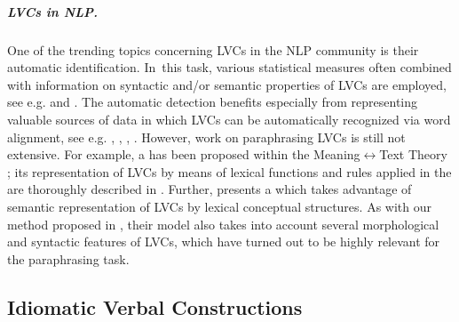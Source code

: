 \documentclass[output=paper
,modfonts
,nonflat]{langsci/langscibook}
\def\footurl#1{\footnote{\url{#1}}}
\begin{document}
\subparagraph{LVCs in NLP.} 
One of the trending topics concerning LVCs in the NLP community is their automatic identification. In~this task, various statistical measures often 
combined with information on syntactic and/or semantic properties of LVCs are
employed, see e.g. \citet{Bannard:2007} and \citet{fazly:2005}. The automatic 
detection benefits especially from  representing valuable 
sources of data in which LVCs can be automatically recognized via word alignment, 
see e.g. \citet{Chen:2015}, \citet{Caseli2010}, \citet{Sinha:2009}, \citet{ZarrieB:2009}.     
However, work on paraphrasing LVCs is still not extensive. For example, a 
 has been proposed within the Meaning$\leftrightarrow$Text 
Theory \citep{ZolkovskijMelcuk65}; its representation of LVCs by means of lexical 
functions and rules applied in the  are thoroughly described in \citet{ramos-07}. 
Further, \citet{Fujita:2004} presents a  which 
takes advantage of semantic representation of LVCs by lexical conceptual structures. 
As with our method proposed in , their model also takes into 
account several morphological and syntactic features of LVCs, which have turned out 
to be highly relevant for the paraphrasing task.   

\subsection{Idiomatic Verbal Constructions}
\label{IVCs}
\end{document}
